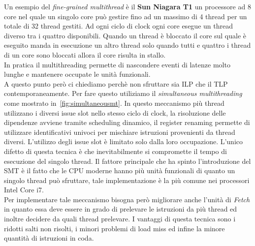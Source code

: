 Un esempio del \emph{fine-grained multithread} è il \textbf{Sun Niagara T1} un processore ad 8 core nel quale un singolo core può gestire fino ad un massimo di 4 thread  per un totale di 32 thread gestiti. Ad ogni ciclo di clock ogni core esegue un thread diverso tra i quattro disponibili. Quando un thread è bloccato il core sul quale è eseguito manda in esecuzione un altro thread solo quando tutti e quattro i thread di un core sono bloccati allora il core risulta in stallo.\\
In pratica il multithreading permette di nascondere eventi di latenze molto lunghe e mantenere occupate le unità funzionali.\\
A questo punto però ci chiediamo perchè non sfruttare sia ILP che il TLP contemporaneamente. Per fare questo utiliziamo il \emph{simultaneous multithreading} come mostrato in \figurename\,\ref{fig:simultaneousmt}. In questo meccanismo più thread utilizzano i diversi issue slot nello stesso ciclo di clock, la risoluzione delle dipendenze avviene tramite scheduling dinamico, il register renaming permette di utilizzare identificativi univoci per mischiare istruzioni provenienti da thread diversi. L'utilizzo degli issue slot è limitato solo dalla loro occupazione. L'unico difetto di questa tecnica è che inevitabilmente si compromette il tempo di esecuzione del singolo thread.
Il fattore principale che ha spinto l'introduzione del SMT è il fatto che le CPU moderne hanno più unità funzionali di quanto un singolo thread può sfruttare, tale implementazione è la più comune nei processori Intel Core i7.\\
Per implementare tale meccanismo bisogna però migliorare anche l'unità di \emph{Fetch} in quanto essa deve essere in grado di prelevare le istruzioni da più thread ed inoltre decidere da quali thread prelevare. I vantaggi di questa tecnica sono i ridotti salti non risolti, i minori problemi di load miss ed infine la minore quantità di istruzioni in coda.